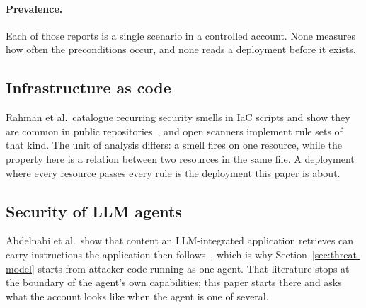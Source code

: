 \paragraph{Prevalence.}
Each of those reports is a single scenario in a controlled account. None
measures how often the preconditions occur, and none reads a deployment before
it exists.

\subsection{Infrastructure as code}

Rahman et al.\ catalogue recurring security smells in IaC scripts and show
they are common in public repositories~\cite{rahman2019sevensins}, and open
scanners implement rule sets of that kind. The unit of analysis differs: a
smell fires on one resource, while the property here is a relation between two
resources in the same file. A deployment where every resource passes every
rule is the deployment this paper is about.

\subsection{Security of LLM agents}

Abdelnabi et al.\ show that content an LLM-integrated application retrieves
can carry instructions the application then
follows~\cite{abdelnabi2023notwhat}, which is why
Section~\ref{sec:threat-model} starts from attacker code running as one
agent. That literature stops at the boundary of the agent's own capabilities;
this paper starts there and asks what the account looks like when the agent is
one of several.
